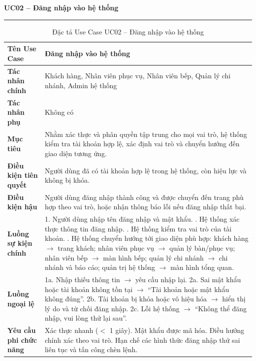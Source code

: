 ﻿\documentclass[../DoAn.tex]{subfiles}
\newcommand{\UCtitle}[1]{%
    \vspace{0.5em}
    {\large\bfseries #1}\\[-0.5em]
    \rule{\textwidth}{0.5pt}
    \vspace{0.3em}
}
\begin{document}
\begin{table}[H]
\UCtitle{UC02 – Đăng nhập vào hệ thống}
\centering
\begin{tabular}{|p{4cm}|p{10.5cm}|}
\hline
\textbf{Tên Use Case} & Đăng nhập vào hệ thống \\ \hline
\textbf{Tác nhân chính} &
Khách hàng, Nhân viên phục vụ, Nhân viên bếp, Quản lý chi nhánh, Admin hệ thống \\ \hline
\textbf{Tác nhân phụ} & Không có \\ \hline
\textbf{Mục tiêu} &
Nhằm xác thực và phân quyền tập trung cho mọi vai trò, hệ thống kiểm tra tài khoản hợp lệ, xác định vai trò và chuyển hướng đến giao diện tương ứng.
\\ \hline
\textbf{Điều kiện tiên quyết} &
Người dùng đã có tài khoản hợp lệ trong hệ thống, còn hiệu lực và không bị khóa.
\\ \hline
\textbf{Điều kiện hậu} &
Người dùng đăng nhập thành công và được chuyển đến trang phù hợp theo vai trò, hoặc nhận thông báo lỗi nếu đăng nhập thất bại.
\\ \hline
\textbf{Luồng sự kiện chính} &
1. Người dùng nhập tên đăng nhập và mật khẩu. \newline
2. Hệ thống xác thực thông tin đăng nhập. \newline
3. Hệ thống kiểm tra vai trò của tài khoản. \newline
4. Hệ thống chuyển hướng tới giao diện phù hợp: khách hàng $\rightarrow$ trang khách; nhân viên phục vụ $\rightarrow$ quản lý bàn/phục vụ; nhân viên bếp $\rightarrow$ màn hình bếp; quản lý chi nhánh $\rightarrow$ chi nhánh và báo cáo; quản trị hệ thống $\rightarrow$ màn hình tổng quan.
\\ \hline
\textbf{Luồng ngoại lệ} &
1a. Nhập thiếu thông tin $\rightarrow$ yêu cầu nhập lại. \newline
2a. Sai mật khẩu hoặc tài khoản không tồn tại $\rightarrow$ ``Tài khoản hoặc mật khẩu không đúng''. \newline
2b. Tài khoản bị khóa hoặc vô hiệu hóa $\rightarrow$ hiển thị lý do và từ chối đăng nhập. \newline
2c. Lỗi hệ thống $\rightarrow$ ``Không thể đăng nhập, vui lòng thử lại sau''.
\\ \hline
\textbf{Yêu cầu phi chức năng} &
Xác thực nhanh ($<$ 1 giây). Mật khẩu được mã hóa. Điều hướng chính xác theo vai trò. Hạn chế các hình thức đăng nhập thử sai liên tục và tấn công chèn lệnh.
\\ \hline
\end{tabular}
\caption{Đặc tả Use Case UC02 – Đăng nhập vào hệ thống}
\end{table}
\end{document}
